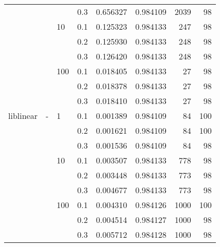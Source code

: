 \begin{table}[H]
\begin{tabular}{llllrrrr}
          &   &     & 0.3 &  0.656327 &  0.984109 &    2039 &    98 \\
          &   & 10  & 0.1 &  0.125323 &  0.984133 &     247 &    98 \\
          &   &     & 0.2 &  0.125930 &  0.984133 &     248 &    98 \\
          &   &     & 0.3 &  0.126420 &  0.984133 &     248 &    98 \\
          &   & 100 & 0.1 &  0.018405 &  0.984133 &      27 &    98 \\
          &   &     & 0.2 &  0.018378 &  0.984133 &      27 &    98 \\
          &   &     & 0.3 &  0.018410 &  0.984133 &      27 &    98 \\
liblinear & - & 1   & 0.1 &  0.001389 &  0.984109 &      84 &   100 \\
          &   &     & 0.2 &  0.001621 &  0.984109 &      84 &   100 \\
          &   &     & 0.3 &  0.001536 &  0.984109 &      84 &    98 \\
          &   & 10  & 0.1 &  0.003507 &  0.984133 &     778 &    98 \\
          &   &     & 0.2 &  0.003448 &  0.984133 &     773 &    98 \\
          &   &     & 0.3 &  0.004677 &  0.984133 &     773 &    98 \\
          &   & 100 & 0.1 &  0.004310 &  0.984126 &    1000 &   100 \\
          &   &     & 0.2 &  0.004514 &  0.984127 &    1000 &    98 \\
          &   &     & 0.3 &  0.005712 &  0.984128 &    1000 &    98 \\
\bottomrule
\end{tabular}
\end{table}
